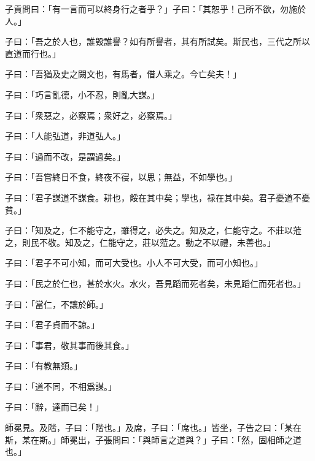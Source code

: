 子貢問曰：「有一言而可以終身行之者乎？」子曰：「其恕乎！己所不欲，勿施於人。」

子曰：「吾之於人也，誰毁誰譽？如有所譽者，其有所試矣。斯民也，三代之所以直道而行也。」

子曰：「吾猶及史之闕文也，有馬者，借人乘之。今亡矣夫！」

子曰：「巧言亂德，小不忍，則亂大謀。」

子曰：「衆惡之，必察焉；衆好之，必察焉。」

子曰：「人能弘道，非道弘人。」

子曰：「過而不改，是謂過矣。」

子曰：「吾嘗終日不食，終夜不寑，以思；無益，不如學也。」

子曰：「君子謀道不謀食。耕也，餒在其中矣；學也，禄在其中矣。君子憂道不憂貧。」

子曰：「知及之，仁不能守之，雖得之，必失之。知及之，仁能守之。不莊以蒞之，則民不敬。知及之，仁能守之，莊以蒞之。動之不以禮，未善也。」

子曰：「君子不可小知，而可大受也。小人不可大受，而可小知也。」

子曰：「民之於仁也，甚於水火。水火，吾見蹈而死者矣，未見蹈仁而死者也。」

子曰：「當仁，不讓於師。」

子曰：「君子貞而不諒。」

子曰：「事君，敬其事而後其食。」

子曰：「有教無類。」

子曰：「道不同，不相爲謀。」

子曰：「辭，達而已矣！」

師冕見。及階，子曰：「階也。」及席，子曰：「席也。」皆坐，子告之曰：「某在斯，某在斯。」師冕出，子張問曰：「與師言之道與？」子曰：「然，固相師之道也。」
